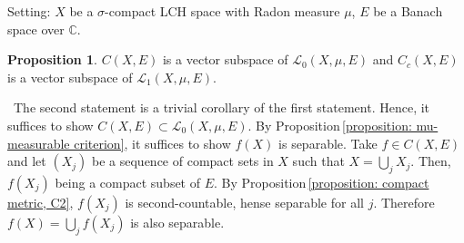 \documentclass[12pt,a4paper]{book}
\newenvironment{prooff}{{\noindent\it\textcolor{cyan!40!black}{Proof}:}\,}{\par}
\newcommand{\bb}[1]{\mathbb{#1}}
\theoremstyle{definition}
\newtheorem{prop}[defn]{Proposition}
\begin{document}
Setting: $X$ be a $\sigma$-compact LCH space with Radon measure $\mu$, $E$ be a Banach space over $\bb{C}$.
\begin{prop}
$C(X, E)$ is a vector subspace of $\mathcal{L}_0(X, \mu, E)$ and $C_c(X, E)$ is a vector subspace of $\mathcal{L}_1(X, \mu, E)$.    
\end{prop}
\begin{prooff}
    The second statement is a trivial corollary of the first statement. Hence, it suffices to show 
    $C(X,E)\subset \mathcal{L}_0(X, \mu, E)$. By Proposition\,\ref{proposition: mu-measurable criterion}, 
    it suffices to show $f(X)$ is separable. 
    Take $f \in C(X, E)$ and let $\left(X_j\right)$ be a sequence of compact sets in $X$ such that $X=\bigcup_j X_j$. 
    Then, $f\left(X_j\right)$ being a compact subset of $E$. By Proposition\,\ref{proposition: compact metric, C2}, $f(X_j)$ is second-countable, hense separable 
    for all $j$. Therefore $f(X)=\bigcup_j f\left(X_j\right)$ is also separable. 
\end{prooff}


\newpage 
\end{document}
